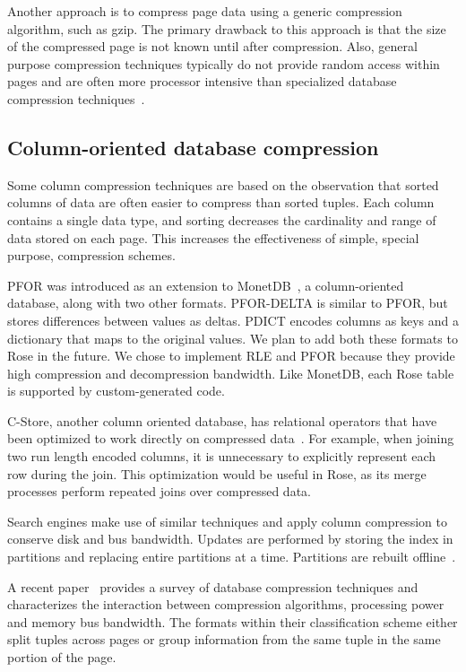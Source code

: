 \documentclass{vldb}
\newcommand{\rows}{Rose\xspace}
\newcommand{\xxx}[1]{\textcolor{red}{\bf XXX: #1}}
\renewcommand{\xxx}[1]{\xspace}
\begin{document}
Another approach is to compress page data using a generic compression
algorithm, such as gzip.  The primary drawback to this approach is
that the size of the compressed page is not known until after
compression.  Also, general purpose compression techniques typically
do not provide random access within pages and are often more processor
intensive than specialized database compression
techniques~\cite{rowImplementationPerf}.

\subsection{Column-oriented database compression}

Some column compression techniques are based on the observation that sorted
columns of data are often easier to compress than sorted tuples.  Each
column contains a single data type, and sorting decreases the
cardinality and range of data stored on each page.  This increases the
effectiveness of simple, special purpose, compression schemes.

PFOR was introduced as an extension to
MonetDB~\cite{pfor}, a column-oriented database, along with two other
formats.  PFOR-DELTA is similar to PFOR, but stores differences between values as
deltas.\xxx{check}  PDICT encodes columns as keys and a dictionary that
maps to the original values.  We plan to add both these formats to
\rows in the future.  We chose to implement RLE and PFOR because they
provide high compression and decompression bandwidth.  Like MonetDB,
each \rows table is supported by custom-generated code.

C-Store, another column oriented database, has relational operators
that have been optimized to work directly on compressed
data~\cite{compExec}.  For example, when joining two run length encoded
columns, it is unnecessary to explicitly represent each row during the
join.  This optimization would be useful in \rows, as its
merge processes perform repeated joins over compressed data.

Search engines make use of similar techniques and apply column compression to conserve
disk and bus bandwidth.  Updates are performed by storing the index in
partitions and replacing entire partitions at a
time.  Partitions are rebuilt offline~\cite{searchengine}.

A recent paper~\cite{bitsForChronos} provides a survey of database compression techniques
and characterizes the interaction between compression algorithms,
processing power and memory bus bandwidth.  The formats within their
classification scheme either split tuples across pages or group
information from the same tuple in the same portion of the
page.
\end{document}
